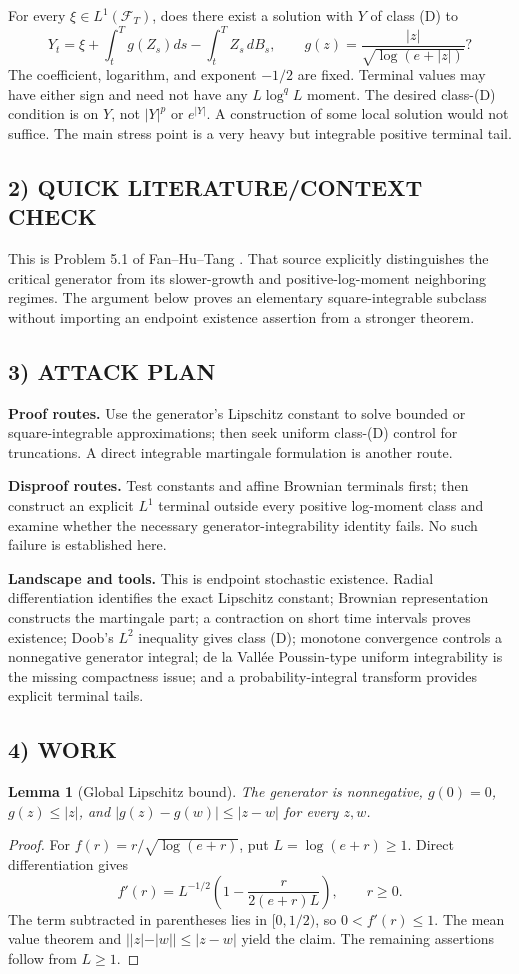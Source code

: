 \documentclass[11pt,a4paper]{article}
\newcommand{\F}{\mathcal F}
\newtheorem{lemma}[theorem]{Lemma}
\theoremstyle{definition}
\begin{document}
For every $\xi\in L^1(\F_T)$, does there exist a solution with $Y$ of class (D) to
\[
 Y_t=\xi+\int_t^T g(Z_s)ds-\int_t^TZ_s\,dB_s,
 \qquad g(z)=\frac{|z|}{\sqrt{\log(e+|z|)}}?
\]
The coefficient, logarithm, and exponent $-1/2$ are fixed. Terminal values may have either sign and need not have any $L\log^q L$ moment. The desired class-(D) condition is on $Y$, not $|Y|^p$ or $e^{|Y|}$. A construction of some local solution would not suffice. The main stress point is a very heavy but integrable positive terminal tail.

\subsection*{2) QUICK LITERATURE/CONTEXT CHECK}
This is Problem 5.1 of Fan--Hu--Tang \cite{FHT}. That source explicitly distinguishes the critical generator from its slower-growth and positive-log-moment neighboring regimes. The argument below proves an elementary square-integrable subclass without importing an endpoint existence assertion from a stronger theorem.

\subsection*{3) ATTACK PLAN}
\textbf{Proof routes.} Use the generator's Lipschitz constant to solve bounded or square-integrable approximations; then seek uniform class-(D) control for truncations. A direct integrable martingale formulation is another route.

\textbf{Disproof routes.} Test constants and affine Brownian terminals first; then construct an explicit $L^1$ terminal outside every positive log-moment class and examine whether the necessary generator-integrability identity fails. No such failure is established here.

\textbf{Landscape and tools.} This is endpoint stochastic existence. Radial differentiation identifies the exact Lipschitz constant; Brownian representation constructs the martingale part; a contraction on short time intervals proves existence; Doob's $L^2$ inequality gives class (D); monotone convergence controls a nonnegative generator integral; de la Vall\'ee Poussin-type uniform integrability is the missing compactness issue; and a probability-integral transform provides explicit terminal tails.

\subsection*{4) WORK}
\begin{lemma}[Global Lipschitz bound]
The generator is nonnegative, $g(0)=0$, $g(z)\le|z|$, and
$|g(z)-g(w)|\le|z-w|$ for every $z,w$.
\end{lemma}
\begin{proof}
For $f(r)=r/\sqrt{\log(e+r)}$, put $L=\log(e+r)\ge1$. Direct differentiation gives
\[
 f'(r)=L^{-1/2}\left(1-\frac{r}{2(e+r)L}\right),\qquad r\ge0.
\]
The term subtracted in parentheses lies in $[0,1/2)$, so $0<f'(r)\le1$. The mean value theorem and $||z|-|w||\le|z-w|$ yield the claim. The remaining assertions follow from $L\ge1$.
\end{proof}
\end{document}
